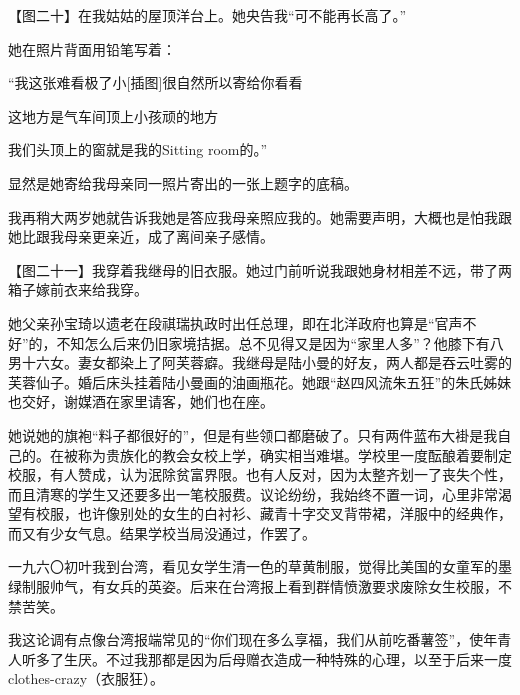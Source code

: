 \par 【图二十】在我姑姑的屋顶洋台上。她央告我“可不能再长高了。”
\par 她在照片背面用铅笔写着：
\par “我这张难看极了小[插图]很自然所以寄给你看看
\par 这地方是气车间顶上小孩顽的地方
\par 我们头顶上的窗就是我的Sitting room的。”
\par 显然是她寄给我母亲同一照片寄出的一张上题字的底稿。
\par 我再稍大两岁她就告诉我她是答应我母亲照应我的。她需要声明，大概也是怕我跟她比跟我母亲更亲近，成了离间亲子感情。
 


\par 【图二十一】我穿着我继母的旧衣服。她过门前听说我跟她身材相差不远，带了两箱子嫁前衣来给我穿。
\par 她父亲孙宝琦以遗老在段祺瑞执政时出任总理，即在北洋政府也算是“官声不好”的，不知怎么后来仍旧家境拮据。总不见得又是因为“家里人多”？他膝下有八男十六女。妻女都染上了阿芙蓉癖。我继母是陆小曼的好友，两人都是吞云吐雾的芙蓉仙子。婚后床头挂着陆小曼画的油画瓶花。她跟“赵四风流朱五狂”的朱氏姊妹也交好，谢媒酒在家里请客，她们也在座。
\par 她说她的旗袍“料子都很好的”，但是有些领口都磨破了。只有两件蓝布大褂是我自己的。在被称为贵族化的教会女校上学，确实相当难堪。学校里一度酝酿着要制定校服，有人赞成，认为泯除贫富界限。也有人反对，因为太整齐划一了丧失个性，而且清寒的学生又还要多出一笔校服费。议论纷纷，我始终不置一词，心里非常渴望有校服，也许像别处的女生的白衬衫、藏青十字交叉背带裙，洋服中的经典作，而又有少女气息。结果学校当局没通过，作罢了。
\par 一九六〇初叶我到台湾，看见女学生清一色的草黄制服，觉得比美国的女童军的墨绿制服帅气，有女兵的英姿。后来在台湾报上看到群情愤激要求废除女生校服，不禁苦笑。
\par 我这论调有点像台湾报端常见的“你们现在多么享福，我们从前吃番薯签”，使年青人听多了生厌。不过我那都是因为后母赠衣造成一种特殊的心理，以至于后来一度clothes-crazy（衣服狂）。



